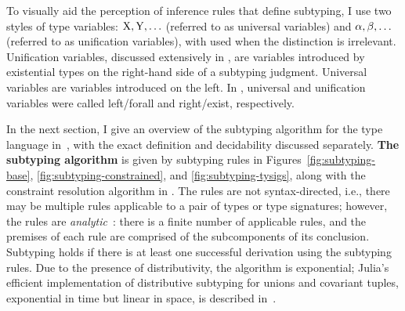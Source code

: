 

To visually aid the perception of inference rules that define subtyping,
I use two styles of type variables: $\mathrm{X}, \mathrm{Y}, \ldots$ (referred to as
universal variables) and $\alpha, \beta, \ldots$ (referred to as unification
variables), with \vany used when the distinction is irrelevant.
{Unification} variables, discussed extensively
in , are variables introduced by existential
types on the right-hand side of a subtyping judgment.
Universal variables are variables introduced on the left.
In , universal and unification variables
were called left/forall and right/exist, respectively.

In the next section, I give an overview of the subtyping
algorithm for the type language in~,
with the exact definition and decidability discussed separately.
\textbf{The subtyping algorithm} is given by subtyping rules in
Figures~\ref{fig:subtyping-base}, \ref{fig:subtyping-constrained}, and
\ref{fig:subtyping-tysigs},
along with the constraint resolution algorithm in .
The rules are not syntax-directed, i.e., there may be multiple rules
applicable to a pair of types or type signatures; however, the rules
are \emph{analytic}~\cite{bib:martin-lof:analytic-synthetic:1994}:
there is a finite number of applicable rules, and the premises of each rule
are comprised of the subcomponents of its conclusion.
Subtyping holds if there is at least one successful derivation using
the subtyping rules.
Due to the presence of distributivity, the algorithm is exponential;
Julia's efficient implementation of distributive subtyping for unions and 
covariant tuples, exponential in time but linear in space, is described
in~\cite{bib:chung:julia-sub-algo:2019}.


